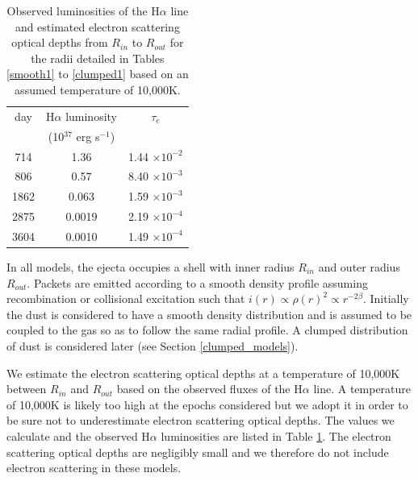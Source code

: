 \documentclass[useAMS,usenatbib,usegraphicx]{mnras}
\begin{document}
\begin{table}
\caption{Observed luminosities of the H$\alpha$ line and estimated electron scattering optical depths from $R_{in}$ to $R_{out}$ for the radii detailed in Tables \ref{smooth1} to \ref{clumped1} based on an assumed temperature of 10,000K.}
\begin{center}
\begin{tabular}{ccc}
\hline
day & H$\alpha$ luminosity & $\tau_e$ \\
& (10$^{37}$ erg s$^{-1}$) & \\
\hline
714 & 1.36 & 1.44 $\times 10^{-2}$ \\
806 & 0.57 & 8.40 $\times 10^{-3}$ \\
1862 & 0.063 & 1.59 $\times 10^{-3}$ \\
2875 & 0.0019 & 2.19 $\times 10^{-4}$ \\
3604 & 0.0010 & 1.49 $\times 10^{-4}$ \\
\hline
\end{tabular}
\end{center}
\label{tau_e}
\end{table}%

In all models, the ejecta occupies a shell with inner radius $R_{in}$ and 
outer radius $R_{out}$.  Packets are emitted according to a smooth density 
profile assuming recombination or collisional excitation such that $i(r) \propto \rho(r)^2 \propto 
r^{-2\beta}$.  Initially the dust is considered to have a smooth density 
distribution and is assumed to be coupled to the gas so as to follow the same 
radial profile.  A clumped distribution of dust is considered later (see 
Section \ref{clumped_models}).  

We estimate the electron scattering optical depths at a temperature of 10,000K between $R_{in}$ and $R_{out}$ based on the observed fluxes of the H$\alpha$ line.  A temperature of 10,000K is likely too high at the epochs considered but we adopt it in order to be sure not to underestimate electron scattering optical depths.  The values we calculate and the observed H$\alpha$ luminosities are listed in Table \ref{tau_e}.  The  electron scattering optical depths are negligibly small and we therefore do not include electron scattering in 
these models.
\end{document}
